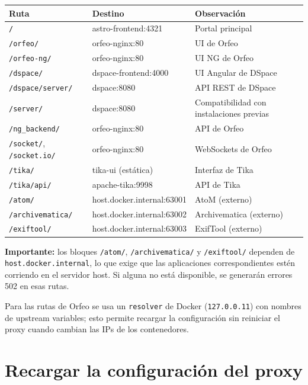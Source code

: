\documentclass[12pt,a4paper]{report}
\begin{document}
\begin{center}
\small
\begin{tabular}{|l|l|l|}
\hline
\textbf{Ruta} & \textbf{Destino} & \textbf{Observación} \\
\hline
\texttt{/} & astro-frontend:4321 & Portal principal \\
\texttt{/orfeo/} & orfeo-nginx:80 & UI de Orfeo \\
\texttt{/orfeo-ng/} & orfeo-nginx:80 & UI NG de Orfeo \\
\texttt{/dspace/} & dspace-frontend:4000 & UI Angular de DSpace \\
\texttt{/dspace/server/} & dspace:8080 & API REST de DSpace \\
\texttt{/server/} & dspace:8080 & Compatibilidad con instalaciones previas \\
\texttt{/ng\_backend/} & orfeo-nginx:80 & API de Orfeo \\
\texttt{/socket/}, \texttt{/socket.io/} & orfeo-nginx:80 & WebSockets de Orfeo \\
\texttt{/tika/} & tika-ui (estática) & Interfaz de Tika \\
\texttt{/tika/api/} & apache-tika:9998 & API de Tika \\
\texttt{/atom/} & host.docker.internal:63001 & AtoM (externo) \\
\texttt{/archivematica/} & host.docker.internal:63002 & Archivematica (externo) \\
\texttt{/exiftool/} & host.docker.internal:63003 & ExifTool (externo) \\
\hline
\end{tabular}
\end{center}

\begin{mdframed}[style=importantstyle]
  \textbf{Importante:} los bloques \texttt{/atom/}, \texttt{/archivematica/} y
  \texttt{/exiftool/} dependen de \texttt{host.docker.internal}, lo que exige
  que las aplicaciones correspondientes estén corriendo en el servidor host.
  Si alguna no está disponible, se generarán errores 502 en esas rutas.
\end{mdframed}

Para las rutas de Orfeo se usa un \texttt{resolver} de Docker
(\texttt{127.0.0.11}) con nombres de upstream variables; esto permite recargar
la configuración sin reiniciar el proxy cuando cambian las IPs de los
contenedores.

\section{Recargar la configuración del proxy}
\end{document}
